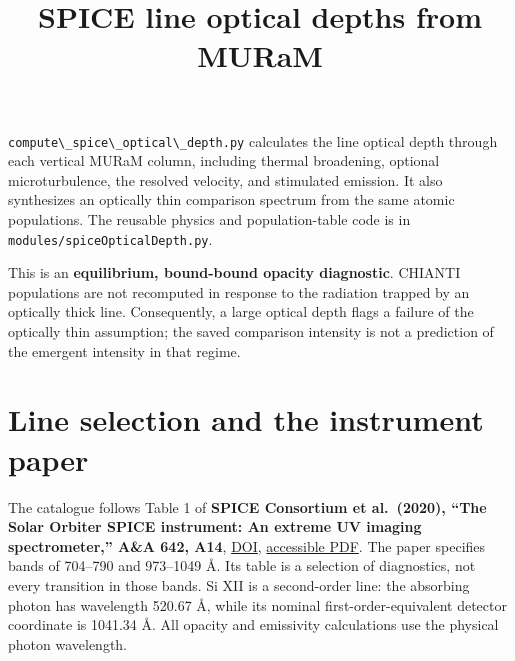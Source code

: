 \documentclass[
]{article}
\title{SPICE line optical depths from MURaM}
\author{}
\date{}
\newcommand{\passthrough}[1]{#1}
\begin{document}
\maketitle

\passthrough{\lstinline!compute\_spice\_optical\_depth.py!} calculates
the line optical depth through each vertical MURaM column, including
thermal broadening, optional microturbulence, the resolved velocity, and
stimulated emission. It also synthesizes an optically thin comparison
spectrum from the same atomic populations. The reusable physics and
population-table code is in
\passthrough{\lstinline!modules/spiceOpticalDepth.py!}.

This is an \textbf{equilibrium, bound-bound opacity diagnostic}. CHIANTI
populations are not recomputed in response to the radiation trapped by
an optically thick line. Consequently, a large optical depth flags a
failure of the optically thin assumption; the saved comparison intensity
is not a prediction of the emergent intensity in that regime.

\section{Line selection and the instrument
paper}\label{line-selection-and-the-instrument-paper}

The catalogue follows Table 1 of \textbf{SPICE Consortium et al.~(2020),
``The Solar Orbiter SPICE instrument: An extreme UV imaging
spectrometer,'' A\&A 642, A14},
\href{https://doi.org/10.1051/0004-6361/201935574}{DOI},
\href{https://www2.mps.mpg.de/homes/solanki/publikationen/j532.pdf}{accessible
PDF}. The paper specifies bands of 704--790 and 973--1049 Å. Its table
is a selection of diagnostics, not every transition in those bands. Si
XII is a second-order line: the absorbing photon has wavelength 520.67
Å, while its nominal first-order-equivalent detector coordinate is
1041.34 Å. All opacity and emissivity calculations use the physical
photon wavelength.
\end{document}

